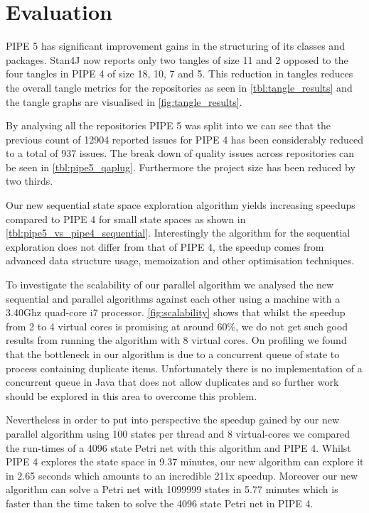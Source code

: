 \section{Evaluation}
PIPE 5 has significant improvement gains in the structuring of its classes and packages. Stan4J now reports only two tangles of size 11 and 2 opposed to the four tangles in PIPE 4 of size 18, 10, 7 and 5. This reduction in tangles reduces the overall tangle metrics for the repositories as seen in \cref{tbl:tangle_results} and the tangle graphs are visualised in \cref{fig:tangle_results}. 

By analysing all the repositories PIPE 5 was split into we can see that the previous count of \num{12904} reported issues for PIPE 4 has been considerably reduced to a total of \num{937} issues. The break down of quality issues across repositories can be seen in \cref{tbl:pipe5_qaplug}. Furthermore the project size has been reduced by two thirds.

Our new sequential state space exploration algorithm  yields increasing speedups compared to PIPE 4 for small state spaces as shown in \cref{tbl:pipe5_vs_pipe4_sequential}. Interestingly the algorithm for the sequential exploration does not differ from that of PIPE 4, the speedup comes from advanced data structure usage, memoization and other optimisation techniques.

To investigate the scalability of our parallel algorithm we analysed the new sequential and parallel algorithms against each other using a machine with a 3.40Ghz quad-core i7 processor. \cref{fig:scalability} shows that whilst the speedup from 2 to 4 virtual cores is promising at around 60\%, we do not get such good results from running the algorithm with 8 virtual cores. On profiling we found that the bottleneck in our algorithm is due to a concurrent queue of state to process containing duplicate items. Unfortunately there is no implementation of a concurrent queue in Java that does not allow duplicates and so further work should be explored in this area to overcome this problem.

Nevertheless in order to put into perspective the speedup gained by our new parallel algorithm using 100 states per thread and 8 virtual-cores we compared the run-times of a \num{4096} state Petri net with this algorithm and PIPE 4. Whilst PIPE 4 explores the state space in 9.37 minutes, our new algorithm can explore it in 2.65 seconds which amounts to an incredible 211x speedup. Moreover our new algorithm can solve a Petri net with \num{1099999} states in 5.77 minutes which is faster than the time taken to solve the \num{4096} state Petri net in PIPE 4.






